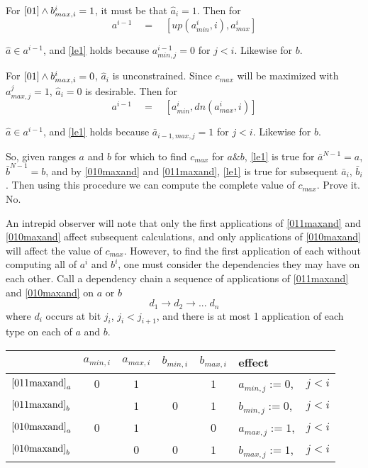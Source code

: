 \documentclass{article}
\begin{document}
For $\eqref{01} \wedge b^i_{max,i} = 1$, it must be that $\hat a_i = 1$. 
Then for
\begin{equation}\label{011maxand} 
a^{i-1} \quad = \quad [up(a^i_{min}, i), a^i_{max}]
\end{equation}

$\hat a \in a^{i-1}$, and
\eqref{le1} holds because $a^{i-1}_{min,j} = 0$ for $j < i$.
Likewise for $b$.
\vspace{10pt}

For $\eqref{01} \wedge b^i_{max,i} = 0$, $\hat a_i$ is unconstrained.
Since $c_{max}$ will be maximized with $a^j_{max,j} = 1$, 
$\hat a_i = 0$ is desirable. Then for
\begin{equation}\label{010maxand} 
a^{i-1} \quad = \quad [a^i_{min}, dn(a^i_{max},i)]
\end{equation}

$\hat a \in a^{i-1}$, and
\eqref{le1} holds because $\bar a_{i-1,max,j} = 1$ for $j<i$.  
Likewise for $b$.
\vspace{10pt}

So, given ranges $a$ and $b$ for which to find $c_{max}$ for $a\&b$,
\eqref{le1} is true for $\bar a^{N-1}=a$, $\bar b^{N-1}=b$, and by
\eqref{010maxand} and \eqref{011maxand}, \eqref{le1} is true for 
subsequent $\bar a_i$, $\bar b_i$. Then using this procedure 
we can compute the complete value of $c_{max}$. Prove it. No.
\vspace{10pt}

An intrepid observer will note that only the first applications of
\eqref{011maxand} and \eqref{010maxand} affect subsequent calculations, and only
applications of \eqref{010maxand} will affect the value of $c_{max}$. 
However, to find the first application of each without computing all of $a^i$
and $b^i$, one must consider the dependencies they
may have on each other. Call a dependency chain a sequence of applications of 
\eqref{011maxand} and \eqref{010maxand} on $a$ or $b$
\begin{equation*}
d_1 \rightarrow d_2 \rightarrow ... \; d_n
\end{equation*}
where $d_i$ occurs at bit $j_i$, $j_i < j_{i+1}$, and there is at most 1 
application of each type on each of $a$ and $b$.
\vspace{10pt}

\begin{tabular}{l|c|c|c|c|l r}
& $a_{min,i}$ & $a_{max,i}$ & $b_{min,i}$ & $b_{max,i}$ & effect &\\
\hline
$\eqref{011maxand}_a$ & $0$ & $1$ & & $1$ & $a_{min,j} := 0$, \;& $j < i$ \\
\hline
$\eqref{011maxand}_b$ & & $1$ & $0$ & $1$ & $b_{min,j} := 0$, \;& $j < i$ \\
\hline
$\eqref{010maxand}_a$ & $0$ & $1$ & & $0$ & $a_{max,j} := 1$, \;& $j < i$ \\
\hline
$\eqref{010maxand}_b$ & & $0$ & $0$ & $1$ & $b_{max,j} := 1$, \;& $j < i$ \\
\end{tabular}
\end{document}
